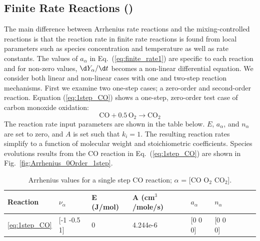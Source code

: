 \documentclass[11pt]{book}
\begin{document}
\FloatBarrier

\subsection{Finite Rate Reactions (\texorpdfstring{}{reactionrate\_arrhenius})}
\label{finite_rate_reactions}
\label{reactionrate_arrhenius_equilibrium}
\label{reactionrate_arrhenius_0order_1step}
\label{reactionrate_arrhenius_2order_1step}
\label{reactionrate_arrhenius_1p75order_2step}
\label{reactionrate_arrhenius_1p75order_2stepr}


The main difference between Arrhenius rate reactions and the mixing-controlled reactions is that the reaction rate in finite rate reactions is found from local parameters such as species concentration and temperature as well as rate constants. The values of $a_{\alpha}$ in Eq.~(\ref{eq:finite_rate1}) are specific to each reaction and for non-zero values, $\d Y_{\alpha}/ \d t$ becomes  a non-linear differential equation. We consider both linear and non-linear cases with one and two-step reaction mechanisms. First we examine two one-step cases; a zero-order and second-order reaction. Equation (\ref{eq:1step_CO}) shows a one-step, zero-order test case of carbon monoxide oxidation:
\begin{equation}\label{eq:1step_CO}
\mathrm{CO+0.5 \, O_2 \rightarrow  CO_2}
\end{equation}
The reaction rate input parameters are shown in the table below. $E$, $a_{\alpha}$, and $n_{\alpha}$ are set to zero, and $A$ is set such that ${k}_{i} = 1$. The resulting reaction rates simplify to a function of molecular weight and stoichiometric coefficients. Species evolutions results from the CO reaction in Eq.~(\ref{eq:1step_CO}) are shown in Fig.~\ref{fig:Arrhenius_0Order_1step}.
\begin{table}[ht]
\begin{center}
\caption[Arrhenius values for a single step CO reaction]{Arrhenius values for a single step CO reaction; $\alpha$ = [$\mathrm{CO}$ $\mathrm{O_2}$ $\mathrm{CO_2}$].}
\label{single_step_co}
\begin{tabular}{|l|l|l|l|l|l|l|l|l|}
\hline Reaction & $\nu_{\alpha}$ & E (J/mol) & A (cm$^3$/mole/s) & $a_{\alpha}$ & $n_{\alpha}$  \\ \hline \hline
\ref{eq:1step_CO} & [-1 -0.5 1] & 0 & 4.244e-6 & [0 0 0] & [0 0 0] \\ \hline
\end{tabular}
\end{center}
\end{table}
\end{document}
